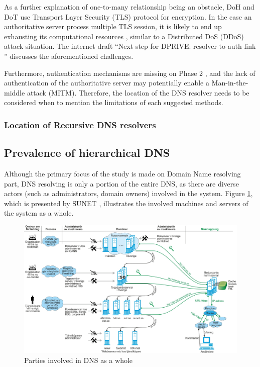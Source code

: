 As a further explanation of one-to-many relationship being an obstacle, DoH \cite{rfc8484} and DoT \cite{hu2016specification} use Transport Layer Security (TLS) protocol \cite{rfc7858} for encryption. In the case an authoritative server process multiple TLS session, it is likely to end up exhausting its computational resources \cite{bhople2012server}, similar to a Distributed DoS (DDoS) attack situation. The internet draft ``Next step for DPRIVE: resolver-to-auth link \cite{I-D.bortzmeyer-dprive-step-2}'' discusses the aforementioned challenges.

Furthermore, authentication mechanisms are missing on Phase 2 \cite{I-D.bortzmeyer-dprive-step-2}, and the lack of authentication of the authoritative server may potentially enable a Man-in-the-middle attack (MITM).
Therefore, the location of the DNS resolver needs to be considered when to mention the limitations of each suggested methods.

\subsubsection{Location of Recursive DNS resolvers}

\FloatBarrier

\subsection{Prevalence of hierarchical DNS}
Although the primary focus of the study is made on Domain Name resolving part, DNS resolving is only a portion of the entire DNS, as there are diverse actors (such as administrators, domain owners) involved in the system.
Figure \ref{dnsactors}, which is presented by SUNET \cite{SUNET-DNS}, illustrates the involved machines and servers of the system as a whole.

\begin{figure}[h!]
    \begin{center}
    \includegraphics*[width=1\columnwidth]{img/DNS-maskinvara}
    \end{center}
    \caption{Parties involved in DNS as a whole \cite{SUNET-DNS}}
    \label{dnsactors}
\end{figure}

